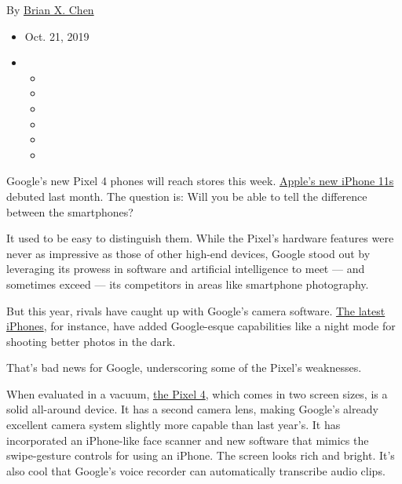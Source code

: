 By \href{https://www.nytimes3xbfgragh.onion/by/brian-x-chen}{Brian X.
Chen}

\begin{itemize}
\item
  Oct. 21, 2019
\item
  \begin{itemize}
  \item
  \item
  \item
  \item
  \item
  \item
  \end{itemize}
\end{itemize}

Google's new Pixel 4 phones will reach stores this week.
\href{https://www.nytimes3xbfgragh.onion/2019/09/17/technology/personaltech/iphone-11-review.html?rref=collection\%2Fbyline\%2Fbrian-x.-chen\&action=click\&contentCollection=undefined\&region=stream\&module=stream_unit\&version=latest\&contentPlacement=9\&pgtype=collection}{Apple's
new iPhone 11s} debuted last month. The question is: Will you be able to
tell the difference between the smartphones?

It used to be easy to distinguish them. While the Pixel's hardware
features were never as impressive as those of other high-end devices,
Google stood out by leveraging its prowess in software and artificial
intelligence to meet --- and sometimes exceed --- its competitors in
areas like smartphone photography.

But this year, rivals have caught up with Google's camera software.
\href{https://www.nytimes3xbfgragh.onion/2019/09/17/technology/personaltech/iphone-11-review.html}{The
latest iPhones}, for instance, have added Google-esque capabilities like
a night mode for shooting better photos in the dark.

That's bad news for Google, underscoring some of the Pixel's weaknesses.

When evaluated in a vacuum,
\href{https://www.nytimes3xbfgragh.onion/2019/10/15/technology/personaltech/google-pixel-photography.html?rref=collection\%2Fbyline\%2Fbrian-x.-chen\&action=click\&contentCollection=undefined\&region=stream\&module=stream_unit\&version=latest\&contentPlacement=2\&pgtype=collection}{the
Pixel 4}, which comes in two screen sizes, is a solid all-around device.
It has a second camera lens, making Google's already excellent camera
system slightly more capable than last year's. It has incorporated an
iPhone-like face scanner and new software that mimics the swipe-gesture
controls for using an iPhone. The screen looks rich and bright. It's
also cool that Google's voice recorder can automatically transcribe
audio clips.

